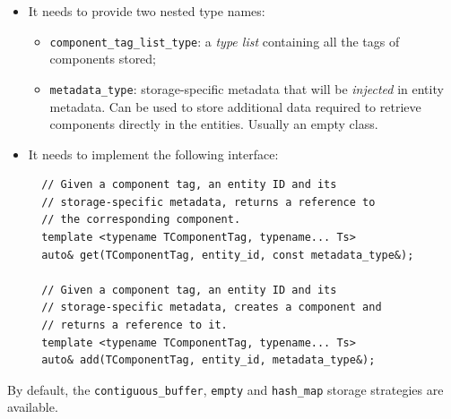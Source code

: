 \documentclass[twoside, 12pt, a4paper, openany]{book}
\begin{document}
\begin{itemize}
\item
  It needs to provide two nested type names:

  \begin{itemize}
  \item
    \texttt{component_tag_list_type}:
    a \emph{type list} containing all the tags of components stored;
  \item
    \texttt{metadata_type}:
    storage-specific metadata that will be \emph{injected} in entity
    metadata. Can be used to store additional data required to retrieve
    components directly in the entities. Usually an empty class.
  \end{itemize}
\item
  It needs to implement the following interface:

  \begin{verbatim}
  // Given a component tag, an entity ID and its
  // storage-specific metadata, returns a reference to
  // the corresponding component.
  template <typename TComponentTag, typename... Ts>
  auto& get(TComponentTag, entity_id, const metadata_type&);

  // Given a component tag, an entity ID and its
  // storage-specific metadata, creates a component and
  // returns a reference to it.
  template <typename TComponentTag, typename... Ts>
  auto& add(TComponentTag, entity_id, metadata_type&);
  \end{verbatim}
\end{itemize}

By default, the
\texttt{contiguous_buffer},
\texttt{empty}
and
\texttt{hash_map}
storage strategies are available.
\end{document}
